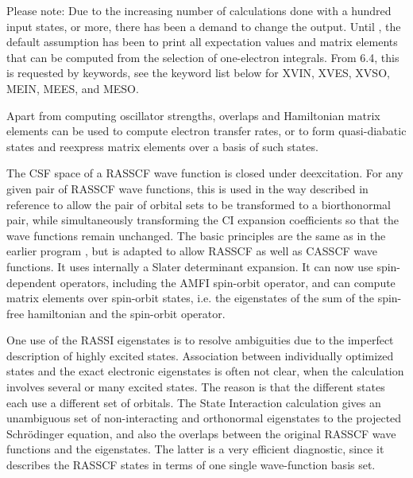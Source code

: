 Please note: Due to the increasing number of calculations done with
a hundred input states, or more, there has been a demand to change
the output. Until , the default assumption has been to print
all expectation values and matrix elements that can be computed from
the selection of one-electron integrals. From 6.4, this is requested by
keywords, see the keyword list below for XVIN, XVES, XVSO, MEIN,
MEES, and MESO.

Apart from computing oscillator strengths, overlaps and Hamiltonian
matrix elements can be used to compute electron transfer rates, or
to form quasi-diabatic states and reexpress matrix elements over a
basis of such states.

The CSF space of a RASSCF wave function is closed under deexcitation.
For any given pair of RASSCF wave functions, this is used in the
way described in reference \cite{Malmqvist:86} to allow the pair of orbital
sets to be transformed to a biorthonormal pair, while simultaneously
transforming the CI expansion coefficients so that the wave functions
remain unchanged. The basic principles are the same as in the earlier
program \cite{Malmqvist:89}, but is adapted to allow RASSCF as well as
CASSCF wave functions. It uses internally a Slater determinant
expansion. It can now use spin-dependent operators,
including the AMFI spin-orbit operator, and can compute matrix elements
over spin-orbit states, i.e. the eigenstates of the sum of the
spin-free hamiltonian and the spin-orbit operator.

One use of the RASSI eigenstates is to resolve ambiguities due
to the imperfect description of highly excited states.
Association between individually optimized states and the exact
electronic eigenstates is often not clear, when the calculation
involves several or many excited states. The reason is that the
different states each use a different set of orbitals. The State
Interaction calculation gives an unambiguous set of non-{}interacting and
orthonormal eigenstates to the projected Schr{\"o}dinger equation, and
also the overlaps between the original RASSCF wave functions and the
eigenstates. The latter is a very efficient diagnostic, since it
describes the RASSCF states in terms of one single wave-{}function basis
set.

